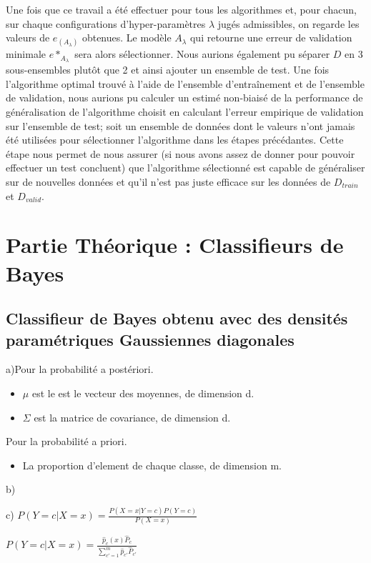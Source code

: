\documentclass[a4paper,10pt]{article}
\begin{document}
Une fois que ce travail a été effectuer pour tous les algorithmes et, pour chacun, sur chaque configurations d'hyper-paramètres $\lambda$ jugés admissibles, on regarde les valeurs de $e_{(A_{\lambda})}$ obtenues. Le modèle $A_{\lambda}$ qui retourne une erreur de validation minimale $e*_{A_{\lambda}}$ sera alors sélectionner. 
Nous aurions également pu séparer $D$ en 3 sous-ensembles plutôt que 2 et ainsi ajouter un ensemble de test. Une fois l'algorithme optimal trouvé à l'aide de l'ensemble d'entraînement et de l'ensemble de validation, nous aurions pu calculer un estimé non-biaisé de la performance de généralisation de l'algorithme choisit en calculant l'erreur empirique de validation sur l'ensemble de test; soit un ensemble de données dont le valeurs n'ont jamais été utilisées pour sélectionner l'algorithme dans les étapes précédantes. Cette étape nous permet de nous assurer (si nous avons assez de donner pour pouvoir effectuer un test concluent) que l'algorithme sélectionné est capable de généraliser sur de nouvelles données et qu'il n'est pas juste efficace sur les données de $D_{train}$ et $D_{valid}$.



\section{Partie Théorique : Classifieurs de Bayes}

\subsection{Classifieur de Bayes obtenu avec des densités paramétriques Gaussiennes diagonales}

a)Pour la probabilité a postériori.
\begin{itemize}
	\item $\mu$ est le est le vecteur des moyennes, de dimension d.
	\item $\Sigma$ est la matrice de covariance, de dimension d.
\end{itemize}
Pour la probabilité a priori.
\begin{itemize}
	\item La proportion d'element de chaque classe, de dimension m.
\end{itemize}

b)

c)
$P(Y=c | X=x)  = \frac{P(X=x | Y=c) P(Y=c)}{P(X=x)} $

$P(Y=c | X=x)  = \frac{ \hat{p}_{c}(x) \hat{P}_{c}}{ \sum_{c'=1}^{m} \hat{p}_{c'} \hat{P}_{c'} } $
\end{document}

